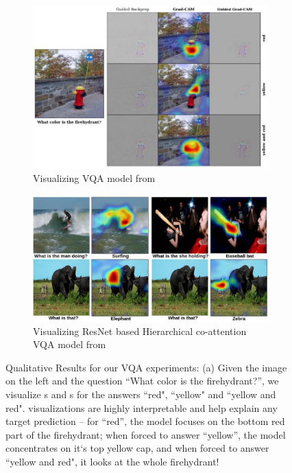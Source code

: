 \begin{figure}[t]
    \begin{subfigure}[t]{\columnwidth}
    \includegraphics[scale=0.315]{figures/vqa_main_fig.jpg}
    \vspace{5pt}
    \caption{\scriptsize{Visualizing VQA model from \cite{Lu2015}}}
    \vspace{35pt}
    \label{fig:vqa_main_fig}
    \end{subfigure}
    \begin{subfigure}[t]{\columnwidth}
    \includegraphics[scale=0.225]{figures/vqa_residual_main.jpg}
    \vspace{10pt}
    \caption{\scriptsize{Visualizing ResNet based Hierarchical co-attention VQA model from \cite{Lu2016}}}
    
        \label{fig:vqa_residual_main}
    \end{subfigure}
	\vspace{14pt}
    \caption{Qualitative Results for our VQA experiments: (a) Given the image on the left and the question ``What color is the firehydrant?'', we visualize \gcam{}s and \cgb{}s for the answers ``red", ``yellow" and ``yellow and red".
        \gcam{} visualizations are highly interpretable and help explain any target prediction -- for ``red'', the model focuses on the bottom red part of the firehydrant; when forced to answer ``yellow'', the model concentrates on it`s top yellow cap, and when forced to answer ``yellow and red", it looks at the whole firehydrant! 
    }
	\label{fig:vqa}
\end{figure}
